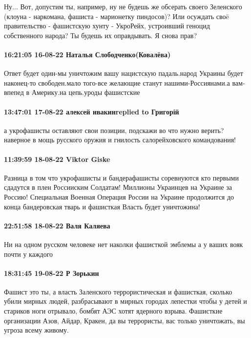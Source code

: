 Ну... Вот, допустим ты, например, ну не будешь же обсерать своего Зеленского (клоуна - наркомана, фашиста - марионетку пиндосов)?
Или осуждать своë правительство - фашистскую хунту - УкроРейх, устроивший геноцид собственного народа?
Ты будешь их оправдывать.
Я снова прав?

\paragraph{16:21:05 16-08-22 Наталья Слободченко(Ковалёва)}

Ответ будет один-мы уничтожим вашу нацистскую падаль.народ Украины будет
наконец-то свободен.мало того-все желающие станут нашими-Россиянами.а
вам-впепед в Америку.на цепь.уроды фашистские

\paragraph{13:47:01 17-08-22 алексей ивакинreplied to Григорій}

а укрофашисты оставляют свои позиции, подскажи во что нужно верить? наверное в
мощь русского оружия и гнилость салорейховского командования!

\paragraph{11:39:59 18-08-22 Viktor Giske}

Разница в том что укрофашисты и бандерафашисты соревнуются кто первыми сдадутся
в плен Россииским Солдатам! Миллионы Украинцев на Украине за Россию!
Специальная Военная Операция России на Украине продолжится до конца
бандеровская тварь и фашисткая Власть будет уничтожина!

\paragraph{22:51:58 18-08-22 Валя Каляева}

Ни на одном русском человеке нет наколки фашисткой эмблемы а у ваших вояк почти
у каждого

\paragraph{18:31:45 19-08-22 Р Зорькин}

Фашист это ты, а власть Заленского террористическая и фашисткая, сколько убили
мирных людей, разбрасывают в мирных городах лепестки чтобы у детей и стариков
ноги отрывало, бомбят АЭС хотят ядерного взрыва. Фашисткие организации Азов,
Айдар, Кракен, да вы террористы, вас только уничтожать, вы угроза всему живому.

